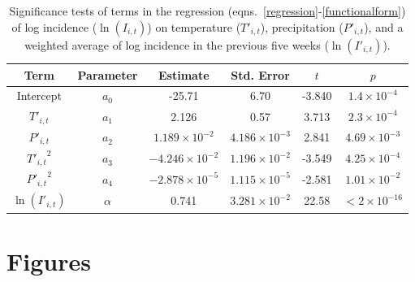 \documentclass[11pt]{article}
\begin{document}
\begin{table}[!ht]
\begin{center}
\begin{tabular}{cccccc}
\hline
Term & Parameter & Estimate & Std. Error & $t$ & $p$ \\
\hline
Intercept & $a_0$ & -25.71 & 6.70 & -3.840 & $1.4\times10^{-4}$ \\
$T'_{i,t}$ & $a_1$ & 2.126 & 0.57 & 3.713 & $2.3\times10^{-4}$ \\
$P'_{i,t}$ & $a_2$ & $1.189\times10^{-2}$ & $4.186\times10^{-3}$ & 2.841 & $4.69\times10^{-3}$ \\
${T'_{i,t}}^2$ & $a_3$ & $-4.246\times10^{-2}$ & $1.196\times10^{-2}$ & -3.549 & $4.25\times10^{-4}$ \\
${P'_{i,t}}^2$ & $a_4$ & $-2.878\times10^{-5}$ & $1.115\times10^{-5}$ & -2.581 & $1.01\times10^{-2}$ \\
$\ln(I'_{i,t})$ & $\alpha$ & 0.741 & $3.281\times10^{-2}$ & 22.58 & $<2\times10^{-16}$ \\
\hline
\end{tabular}
\end{center}
\caption{
Significance tests of terms in the regression (eqns.~\eqref{regression}-\eqref{functionalform}) of log incidence ($\ln(I_{i,t})$) on temperature ($T'_{i,t}$), precipitation ($P'_{i,t}$), and a weighted average of log incidence in the previous five weeks ($\ln(I'_{i,t})$).}
\end{table}



\newpage
\section*{Figures}
\end{document}
